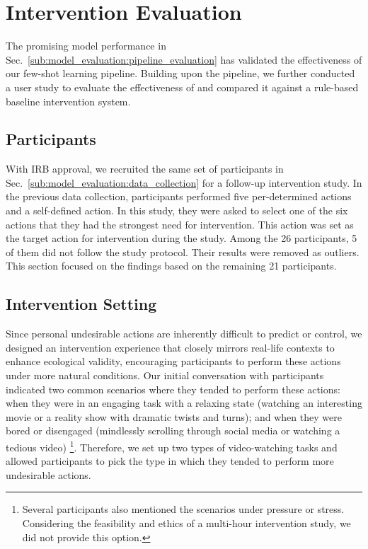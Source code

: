 \section{Intervention Evaluation}
\label{sec:intervention_evaluation}
The promising model performance in Sec.~\ref{sub:model_evaluation:pipeline_evaluation} has validated the effectiveness of our few-shot learning pipeline.
Building upon the pipeline, we further conducted a user study to evaluate the effectiveness of \projectname and compared it against a rule-based baseline intervention system.

\subsection{Participants}
\label{sub:intervention_evaluation:participants}
With IRB approval, we recruited the same set of participants in Sec.~\ref{sub:model_evaluation:data_collection} for a follow-up intervention study. 
In the previous data collection, participants performed five per-determined actions and a self-defined action. In this study, they were asked to select one of the six actions that they had the strongest need for intervention.
This action was set as the target action for intervention during the study.
Among the 26 participants, 5 of them did not follow the study protocol. Their results were removed as outliers.  This section focused on the findings based on the remaining 21 participants.

\subsection{Intervention Setting}
\label{sub:intervention_evaluation:setting}
Since personal undesirable actions are inherently difficult to predict or control, we designed an intervention experience that closely mirrors real-life contexts to enhance ecological validity, encouraging participants to perform these actions under more natural conditions.
Our initial conversation with participants indicated two common scenarios where they tended to perform these actions: when they were in an engaging task with a relaxing state (\eg watching an interesting movie or a reality show with dramatic twists and turns); and when they were bored or disengaged (\eg mindlessly scrolling through social media or watching a tedious video) \footnote{Several participants also mentioned the scenarios under pressure or stress. Considering the feasibility and ethics of a multi-hour intervention study, we did not provide this option.}.
Therefore, we set up two types of video-watching tasks and allowed participants to pick the type in which they tended to perform more undesirable actions.

